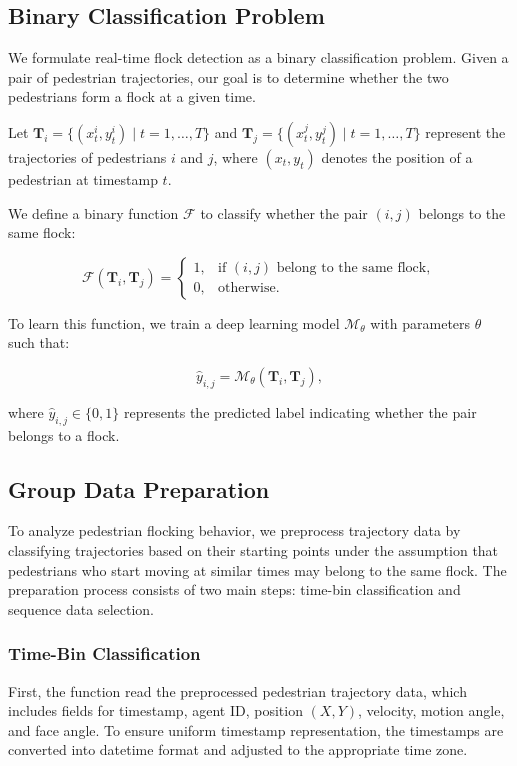 \documentclass{article}
\begin{document}
\subsection{Binary Classification Problem}

We formulate real-time flock detection as a binary classification problem. Given a pair of pedestrian trajectories, our goal is to determine whether the two pedestrians form a flock at a given time.  

Let $\mathbf{T}_i = \{(x_t^i, y_t^i) \mid t = 1, \dots, T\}$ and $\mathbf{T}_j = \{(x_t^j, y_t^j) \mid t = 1, \dots, T\}$ represent the trajectories of pedestrians $i$ and $j$, where $(x_t, y_t)$ denotes the position of a pedestrian at timestamp $t$.  

We define a binary function $\mathcal{F}$ to classify whether the pair $(i, j)$ belongs to the same flock:  

\begin{equation}
    \mathcal{F}(\mathbf{T}_i, \mathbf{T}_j) =
    \begin{cases}
      1, & \text{if } (i, j) \text{ belong to the same flock}, \\
      0, & \text{otherwise}.
    \end{cases}
\end{equation}

To learn this function, we train a deep learning model $\mathcal{M}_{\theta}$ with parameters $\theta$ such that:  

\begin{equation}
    \hat{y}_{i,j} = \mathcal{M}_{\theta}(\mathbf{T}_i, \mathbf{T}_j),
\end{equation}

where $\hat{y}_{i,j} \in \{0,1\}$ represents the predicted label indicating whether the pair belongs to a flock.
\subsection{Group Data Preparation}\label{Group_Data_Preperation}


To analyze pedestrian flocking behavior, we preprocess trajectory data by classifying trajectories based on their starting points under the assumption that pedestrians who start moving at similar times may belong to the same flock. The preparation process consists of two main steps: time-bin classification and sequence data selection.

\subsubsection{Time-Bin Classification}
First, the function read the preprocessed pedestrian trajectory data, which includes fields for timestamp, agent ID, position $(X,Y)$, velocity, motion angle, and face angle. To ensure uniform timestamp representation, the timestamps are converted into datetime format and adjusted to the appropriate time zone.
\end{document}
